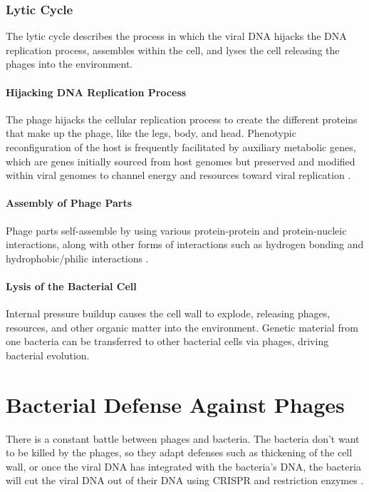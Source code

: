 \subsubsection{Lytic Cycle}
The lytic cycle describes the process in which the viral DNA hijacks the DNA replication process, assembles within the cell, and lyses the cell releasing the phages into the environment. 
\paragraph{Hijacking DNA Replication Process}
The phage hijacks the cellular replication process to create the different proteins that make up the phage, like the legs, body, and head. 
Phenotypic reconfiguration of the host is frequently facilitated by auxiliary metabolic genes, which are genes initially sourced from host genomes but preserved and modified within viral genomes to channel energy and resources toward viral replication \cite{warwick-dugdaleHosthijackingPlanktonicPiracy2019}. 
\paragraph{Assembly of Phage Parts}
Phage parts self-assemble by using various protein-protein and protein-nucleic interactions, along with other forms of interactions such as hydrogen bonding and hydrophobic/philic interactions \cite{aksyukBacteriophageAssembly2011}. 
\paragraph{Lysis of the Bacterial Cell}
Internal pressure buildup causes the cell wall to explode, releasing phages, resources, and other organic matter into the environment. 
Genetic material from one bacteria can be transferred to other bacterial cells via phages, driving bacterial evolution. 


\section{Bacterial Defense Against Phages} 
There is a constant battle between phages and bacteria. 
The bacteria don't want to be killed by the phages, so they adapt defenses such as thickening of the cell wall, or once the viral DNA has integrated with the bacteria's DNA, the bacteria will cut the viral DNA out of their DNA using CRISPR and restriction enzymes \cite{iglerPhenotypicFluxRole2022}. 

